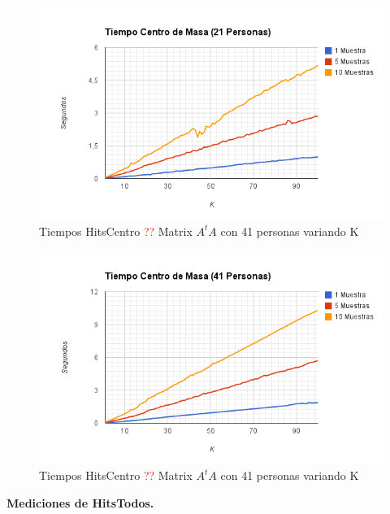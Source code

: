 \begin{figure}[H]
\includegraphics[width=1\textwidth]{img/imagef8.png}
     \caption{Tiempos HitsCentro \textcolor{red}{??} Matrix $A^tA$ con 41 personas variando K}
     \label{fig:figura1}
\end{figure}

\begin{figure}[H]
\includegraphics[width=1\textwidth]{img/imagef9.png}
     \caption{Tiempos HitsCentro \textcolor{red}{??} Matrix $A^tA$ con 41 personas variando K}
     \label{fig:figura1}
\end{figure}


\textbf{Mediciones de HitsTodos. }

